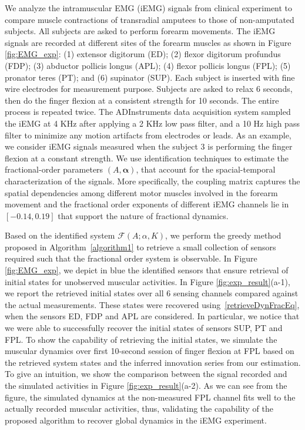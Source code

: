 We analyze the intramuscular EMG (iEMG) signals from clinical experiment to compare muscle contractions of transradial amputees to those of non-amputated subjects. All subjects are asked to perform forearm movements. The iEMG signals are recorded at different sites of the forearm muscles as shown in Figure \ref{fig:EMG_exp}: (1) extensor digitorum (ED); (2) flexor digitorum profundus (FDP); (3) abductor pollicis longus (APL); (4) flexor pollicis longus (FPL); (5) pronator teres (PT); and (6) supinator (SUP). Each subject is inserted with fine wire electrodes for measurement purpose. Subjects are asked to relax 6 seconds, then do the finger flexion at a consistent strength for 10 seconds. The entire process is repeated twice. The ADInstruments data acquisition system sampled the iEMG at 4 KHz after applying a 2 KHz low pass filter, and a 10 Hz high pass filter to minimize any motion artifacts from electrodes or leads.
 As an example, we consider iEMG signals measured when the subject 3 is performing the finger flexion at a constant strength. We use identification techniques to estimate the fractional-order parameters $(A,\mathbf{\alpha})$, that account for the spacial-temporal characterization of the signals. More specifically, the coupling matrix captures the spatial dependencies among different motor muscles involved in the forearm movement and the fractional order exponents of different iEMG channels lie in $[-0.14, 0.19]$ that support the nature of fractional dynamics.
 
 Based on the identified system $\mathcal F(A;\mathbb{\alpha},K)$, we perform the greedy method proposed in Algorithm~\ref{algorithm1} to retrieve a small collection of sensors required such that the fractional order system is observable. In Figure \ref{fig:EMG_exp}, we depict in blue the identified sensors that ensure retrieval of initial states for unobserved muscular activities. In Figure \ref{fig:exp_result}(a-1), we report the retrieved initial states over all 6 sensing channels compared against the actual measurements. These states were recovered using~\eqref{retrieveDynFracEq}, when the sensors ED, FDP and APL are considered. In particular, we notice that we were able to successfully recover the initial states of sensors SUP, PT and FPL. To show the capability of retrieving the initial states, we simulate the muscular dynamics over first 10-second session of finger flexion at FPL based on the retrieved system states and the inferred innovation series from our estimation. To give an intuition, we show the comparison between the signal recorded and the simulated activities in Figure \ref{fig:exp_result}(a-2). As we can see from the figure, the simulated dynamics at the non-measured FPL channel fits well to the actually recorded muscular activities, thus, validating the capability of the proposed algorithm to recover global dynamics in the iEMG experiment.
 
